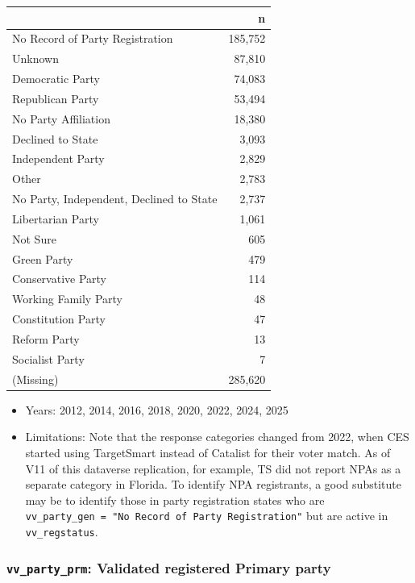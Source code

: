 \documentclass[10pt,article,oneside]{memoir}
\begin{document}
\begin{table}[H]
\centering
\begin{tabular}[t]{lr}
\toprule
 & n\\
\midrule
No Record of Party Registration & 185,752\\
Unknown & 87,810\\
Democratic Party & 74,083\\
Republican Party & 53,494\\
No Party Affiliation & 18,380\\
Declined to State & 3,093\\
Independent Party & 2,829\\
Other & 2,783\\
No Party, Independent, Declined to State & 2,737\\
Libertarian Party & 1,061\\
Not Sure & 605\\
Green Party & 479\\
Conservative Party & 114\\
Working Family Party & 48\\
Constitution Party & 47\\
Reform Party & 13\\
Socialist Party & 7\\
(Missing) & 285,620\\
\bottomrule
\end{tabular}
\end{table}

\begin{itemize}
\tightlist
\item
  Years: 2012, 2014, 2016, 2018, 2020, 2022, 2024, 2025
\item
  Limitations: Note that the response categories changed from 2022, when
  CES started using TargetSmart instead of Catalist for their voter
  match. As of V11 of this dataverse replication, for example, TS did
  not report NPAs as a separate category in Florida. To identify NPA
  registrants, a good substitute may be to identify those in party
  registration states who are
  \texttt{vv\_party\_gen\ =\ "No\ Record\ of\ Party\ Registration"} but
  are active in \texttt{vv\_regstatus}.
\end{itemize}

\subsubsection{\texorpdfstring{\texttt{vv\_party\_prm}: Validated
registered Primary
party}{vv\_party\_prm: Validated registered Primary party}}\label{vv_party_prm-validated-registered-primary-party}
\end{document}
